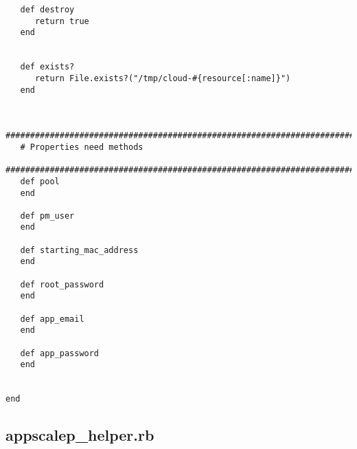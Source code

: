 \begin{lstlisting}
   def destroy
      return true
   end


   def exists?
      return File.exists?("/tmp/cloud-#{resource[:name]}")
   end
   
   
   #############################################################################
   # Properties need methods
   #############################################################################
   def pool
   end
   
   def pm_user
   end
   
   def starting_mac_address
   end
   
   def root_password
   end
   
   def app_email
   end
   
   def app_password
   end
   
   
end
\end{lstlisting}


\subsection{appscalep\_helper.rb}


